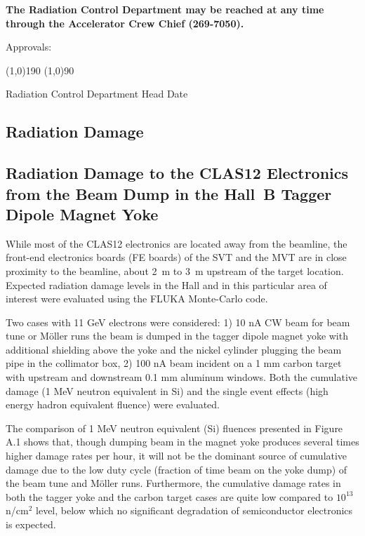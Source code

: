 \documentclass [12pt]{article}
\begin{document}
{\bf The Radiation Control Department may be reached at any time through the
Accelerator Crew Chief (269-7050). }

\vspace{3.cm}
Approvals:

\vspace{1.cm}
\line(1,0){190}                    
\hspace{3cm}         \line(1,0){90}  

Radiation Control Department Head               \hspace{3cm}                  Date


\clearpage
\begin{appendices}
\section{Radiation Damage} 
\subsection{Radiation Damage to the CLAS12 Electronics from the Beam Dump in the Hall~B Tagger Dipole Magnet Yoke}

While most of the CLAS12 electronics are located away from the beamline, the front-end electronics 
boards (FE boards) of the SVT and the MVT are in close proximity to the beamline, about 2~m to 3~m 
upstream of the target location. Expected radiation damage levels in the Hall and in this particular area of interest were evaluated using the FLUKA Monte-Carlo code.

Two cases with 11 GeV electrons were considered: 1) 10 nA CW beam for beam tune or M{\"o}ller runs the beam is dumped in the tagger dipole magnet yoke with additional shielding above the yoke and the nickel cylinder plugging the beam pipe in the collimator box, 2) 100 nA beam incident on a 1 mm carbon target with upstream and downstream 0.1 mm aluminum windows. Both the cumulative damage (1 MeV neutron equivalent in Si) and the single event effects (high energy hadron equivalent fluence) were evaluated.

The comparison of 1 MeV neutron equivalent (Si) fluences presented in Figure A.1 shows that, though dumping beam in the magnet yoke produces several times higher damage rates per hour, it will not be the dominant source of cumulative damage due to the low duty cycle (fraction of time beam on the yoke dump) of the beam tune and M{\"o}ller runs. Furthermore, the cumulative damage rates in both the tagger yoke and the carbon target cases are quite low compared to $10^{13}$ n/cm$^{2}$ level, below which no significant degradation of semiconductor electronics is expected.


\end{appendices}
\end{document}
